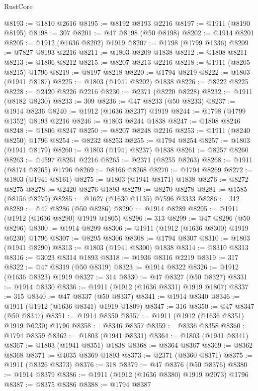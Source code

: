 \begin{lexlean}{RustCore}
\begin{coremodule}
@8193 := @1810 @2616
@8195 := @8192 @8193 @2216
@8197 := @1911 (@8190 @8195)
@8198 := 307
@8201 := @47 @8198 (@50 @8198)
@8202 := @1914 @8201
@8205 := @1912 (@1636 @8202) @1919
@8207 := @1798 (@1799 @1336)
@8209 := @7827 @8193 @2216
@8211 := @1803 @8209 @1838
@8212 := @1808 @8211
@8213 := @1806 @8212
@8215 := @8207 @8213 @2216
@8218 := @1911 (@8205 @8215) @1796
@8219 := @8197 @8218
@8220 := @1794 @8219
@8222 := @1803 (@1941 @8187)
@8225 := @1803 (@1941 @8202) @1838
@8226 := @8222 @8225
@8228 := @2420 @8226 @2216
@8230 := @2371 (@8220 @8228)
@8232 := @1911 (@8182 @8230)
@8233 := 309
@8236 := @47 @8233 (@50 @8233)
@8237 := @1914 @8236
@8240 := @1912 (@1636 @8237) @1919
@8244 := @1798 (@1799 @1352) @8193 @2216
@8246 := @1803 @8244 @1838
@8247 := @1808 @8246
@8248 := @1806 @8247
@8250 := @8207 @8248 @2216
@8253 := @1911 (@8240 @8250) @1796
@8254 := @8232 @8253
@8255 := @1794 @8254
@8257 := @1803 (@1941 @8179)
@8260 := @1803 (@1941 @8237) @1838
@8261 := @8257 @8260
@8263 := @4597 @8261 @2216
@8265 := @2371 (@8255 @8263)
@8268 := @1911 (@8174 @8265) @1796
@8269 := @8166 @8268
@8270 := @1794 @8269
@8272 := @1803 (@1941 @8161)
@8275 := @1803 (@1941 @8171) @1838
@8276 := @8272 @8275
@8278 := @2420 @8276 @1893
@8279 := @8270 @8278
@8281 := @1585 (@8156 @8279)
@8285 := @1627 (@1630 @1135) @7596 @3333
@8286 := 312
@8289 := @47 @8286 (@50 @8286)
@8290 := @1914 @8289
@8295 := @1911 (@1912 (@1636 @8290) @1919 @1805)
@8296 := 313
@8299 := @47 @8296 (@50 @8296)
@8300 := @1914 @8299
@8306 := @1911 (@1912 (@1636 @8300) @1919 @6230) @1796
@8307 := @8295 @8306
@8308 := @1794 @8307
@8310 := @1803 (@1941 @8290)
@8313 := @1803 (@1941 @8300) @1838
@8314 := @8310 @8313
@8316 := @3023 @8314 @1893
@8318 := @1936 @8316 @2219
@8319 := 317
@8322 := @47 @8319 (@50 @8319)
@8323 := @1914 @8322
@8326 := @1912 (@1636 @8323) @1919
@8327 := 314
@8330 := @47 @8327 (@50 @8327)
@8331 := @1914 @8330
@8336 := @1911 (@1912 (@1636 @8331) @1919 @1807)
@8337 := 315
@8340 := @47 @8337 (@50 @8337)
@8341 := @1914 @8340
@8346 := @1911 (@1912 (@1636 @8341) @1919 @1809)
@8347 := 316
@8350 := @47 @8347 (@50 @8347)
@8351 := @1914 @8350
@8357 := @1911 (@1912 (@1636 @8351) @1919 @6230) @1796
@8358 := @8346 @8357
@8359 := @8336 @8358
@8360 := @1794 @8359
@8362 := @1803 (@1941 @8331)
@8364 := @1803 (@1941 @8341)
@8367 := @1803 (@1941 @8351) @1838
@8368 := @8364 @8367
@8369 := @8362 @8368
@8371 := @4035 @8369 @1893
@8373 := @2371 (@8360 @8371)
@8375 := @1911 (@8326 @8373)
@8376 := 318
@8379 := @47 @8376 (@50 @8376)
@8380 := @1914 @8379
@8386 := @1911 (@1912 (@1636 @8380) @1919 @2073) @1796
@8387 := @8375 @8386
@8388 := @1794 @8387

\end{coremodule}
\end{lexlean}
